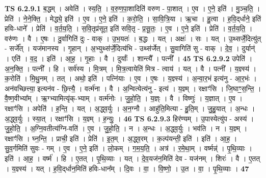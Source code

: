 \documentclass[17pt]{extarticle}
\begin{document}
                                \textbf{ TS 6.2.9.1} \newline
                  ब॒द्धम् । अवेति॑ । स्य॒ति॒ । व॒रु॒ण॒पा॒शादिति॑ वरुण - पा॒शात् । ए॒व । ए॒ने॒ इति॑ । मु॒ञ्च॒ति॒ । प्रेति॑ । ने॒ने॒क्ति॒ । मेद्ध्ये॒ इति॑ । ए॒व । ए॒ने॒ इति॑ । क॒रो॒ति॒ । सा॒वि॒त्रि॒या । ऋ॒चा । हु॒त्वा । ह॒वि॒द्‌र्धाने॒ इति॑ हविः-धाने᳚ । प्रेति॑ । व॒र्त॒य॒ति॒ । स॒वि॒तृप्र॑सूत॒ इति॑ सवि॒तृ - प्र॒सू॒तः॒ । ए॒व । ए॒ने॒ इति॑ । प्रेति॑ । व॒र्त॒य॒ति॒ । वरु॑णः । वै । ए॒षः । दु॒र्वागिति॑ दुः - वाक् । उ॒भ॒यतः॑ । ब॒द्धः । यत् । अक्षः॑ । सः । यत् । उ॒थ्सर्जे॒दित्यु॑त् - सर्जे᳚त् । यज॑मानस्य । गृ॒हान् । अ॒भ्युथ्स॑र्जे॒दित्य॑भि - उथ्स॑र्जेत् । सु॒वागिति॑ सु - वाक् । दे॒व॒ । दुर्यान्॑ । एति॑ । व॒द॒ । इति॑ । आ॒ह॒ । गृ॒हाः । वै । दुर्याः᳚ । शान्त्यै᳚ । पत्नी᳚ । \textbf{  45} \newline
                  \newline
                                \textbf{ TS 6.2.9.2} \newline
                  उपेति॑ । अ॒न॒क्ति॒ । पत्नी᳚ । हि । सर्व॑स्य । मि॒त्रम् । मि॒त्र॒त्वायेति॑ मित्र - त्वाय॑ । यत् । वै । पत्नी᳚ । य॒ज्ञ्स्य॑ । क॒रोति॑ । मि॒थु॒नम् । तत् । अथो॒ इति॑ । पत्नि॑याः । ए॒व । ए॒षः । य॒ज्ञ्स्य॑ । अ॒न्वा॒र॒भं इत्य॑नु - आ॒र॒भंः । अन॑वच्छित्त्या॒ इत्यन॑व - छि॒त्त्यै॒ । वर्त्म॑ना । वै । अ॒न्वित्येत्य॑नु - इत्य॑ । य॒ज्ञ्म् । रक्षाꣳ॑सि । जि॒घाꣳ॒॒स॒न्ति॒ । वै॒ष्ण॒वीभ्या᳚म् । ऋ॒ग्भ्यामित्यृ॑क्-भ्याम् । वर्त्म॑नोः । जु॒हो॒ति॒ । य॒ज्ञ्ः । वै । विष्णुः॑ । य॒ज्ञात् । ए॒व । रक्षाꣳ॑सि । अपेति॑ । ह॒न्ति॒ । यत् । अ॒द्ध्व॒र्युः । अ॒न॒ग्नौ । आहु॑ति॒मित्या - हु॒ति॒म् । जु॒हु॒यात् । अ॒न्धः । अ॒द्ध्व॒र्युः । स्या॒त् । रक्षाꣳ॑सि । य॒ज्ञ्म् । ह॒न्युः॒ । \textbf{  46} \newline
                  \newline
                                \textbf{ TS 6.2.9.3} \newline
                  हिर॑ण्यम् । उ॒पास्येत्यु॑प - अस्य॑ । जु॒हो॒ति॒ । अ॒ग्नि॒वतीत्य॑ग्नि-वति॑ । ए॒व । जु॒हो॒ति॒ । न । अ॒न्धः । अ॒द्ध्व॒र्युः । भव॑ति । न । य॒ज्ञ्म् । रक्षाꣳ॑सि । घ्न॒न्ति॒ । प्राची॒ इति॑ । प्रेति॑ । इ॒त॒म् । अ॒द्ध्व॒रम् । क॒ल्प॑यन्ती॒ इति॑ । इति॑ । आ॒ह॒ । सु॒व॒र्गमिति॑ सुवः - गम् । ए॒व । ए॒ने॒ इति॑ । लो॒कम् । ग॒म॒य॒ति॒ । अत्र॑ । र॒मे॒था॒म् । वर्ष्मन्न्॑ । पृ॒थि॒व्याः । इति॑ । आ॒ह॒ । वर्ष्म॑ । हि । ए॒तत् । पृ॒थि॒व्याः । यत् । दे॒व॒यज॑न॒मिति॑ देव - यज॑नम् । शिरः॑ । वै । ए॒तत् । य॒ज्ञ्स्य॑ । यत् । ह॒वि॒द्‌र्धान॒मिति॑ हविः-धान᳚म् । दि॒वः । वा॒ । वि॒ष्णो॒ । उ॒त । वा॒ । पृ॒थि॒व्याः । \textbf{  47} \newline
                  \newline
\end{document}
